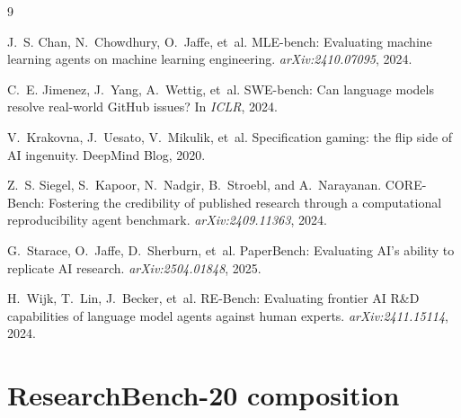 \documentclass{article}
\begin{document}

\begin{thebibliography}{9}

J.~S. Chan, N.~Chowdhury, O.~Jaffe, et~al.
\newblock MLE-bench: Evaluating machine learning agents on machine learning
  engineering.
\newblock \emph{arXiv:2410.07095}, 2024.

C.~E. Jimenez, J.~Yang, A.~Wettig, et~al.
\newblock SWE-bench: Can language models resolve real-world GitHub issues?
\newblock In \emph{ICLR}, 2024.

V.~Krakovna, J.~Uesato, V.~Mikulik, et~al.
\newblock Specification gaming: the flip side of AI ingenuity.
\newblock DeepMind Blog, 2020.

Z.~S. Siegel, S.~Kapoor, N.~Nadgir, B.~Stroebl, and A.~Narayanan.
\newblock CORE-Bench: Fostering the credibility of published research through a
  computational reproducibility agent benchmark.
\newblock \emph{arXiv:2409.11363}, 2024.

G.~Starace, O.~Jaffe, D.~Sherburn, et~al.
\newblock PaperBench: Evaluating AI's ability to replicate AI research.
\newblock \emph{arXiv:2504.01848}, 2025.

H.~Wijk, T.~Lin, J.~Becker, et~al.
\newblock RE-Bench: Evaluating frontier AI R\&D capabilities of language model
  agents against human experts.
\newblock \emph{arXiv:2411.15114}, 2024.

\end{thebibliography}

\appendix

\section{ResearchBench-20 composition}
\label{app:papers}
\end{document}
